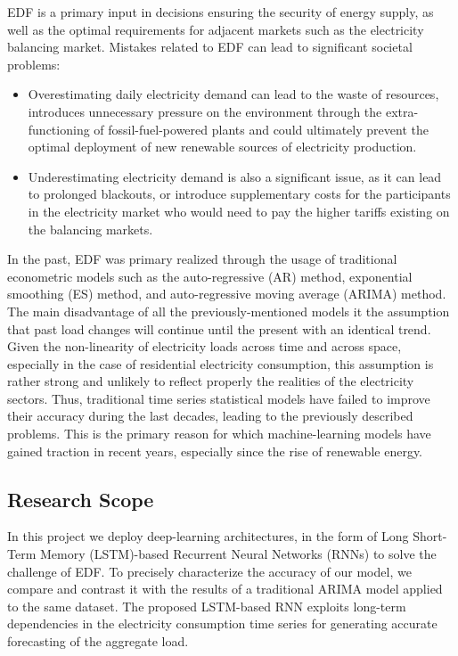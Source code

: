 \documentclass[10pt,twocolumn,letterpaper]{article}
\begin{document}
EDF is a primary input in decisions ensuring the security of energy supply, as well as the optimal requirements for adjacent markets such as the electricity balancing market. Mistakes related to EDF can lead to significant societal problems:

\begin{itemize}
\item	Overestimating daily electricity demand can lead to the waste of resources, introduces unnecessary pressure on the environment through the extra-functioning of fossil-fuel-powered plants and could ultimately prevent the optimal deployment of new renewable sources of electricity production. 
\item Underestimating electricity demand is also a significant issue, as it can lead to prolonged blackouts, or introduce supplementary costs for the participants in the electricity market who would need to pay the higher tariffs existing on the balancing markets.
\end{itemize}

In the past, EDF was primary realized through the usage of traditional econometric models such as the auto-regressive (AR) method, exponential smoothing (ES) method, and auto-regressive moving average (ARIMA) method. The main disadvantage of all the previously-mentioned models it the assumption that past load changes will continue until the present with an identical trend. Given the non-linearity of electricity loads across time and across space, especially in the case of residential electricity consumption, this assumption is rather strong and unlikely to reflect properly the realities of the electricity sectors. Thus, traditional time series statistical models have failed to improve their accuracy during the last decades, leading to the previously described problems. This is the primary reason for which machine-learning models have gained traction in recent years, especially since the rise of renewable energy. 

\subsection{Research Scope}

In this project we deploy deep-learning architectures, in the form of Long Short-Term Memory (LSTM)-based Recurrent Neural Networks (RNNs) to solve the challenge of EDF. To precisely characterize the accuracy of our model, we compare and contrast it with the results of a traditional ARIMA model applied to the same dataset. The proposed LSTM-based RNN exploits long-term dependencies in the electricity consumption time series for generating accurate forecasting of the aggregate load. 
\end{document}
